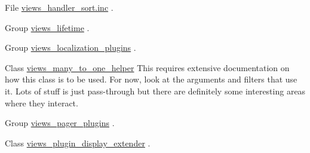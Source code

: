 \begin{DoxyDescription}
\item[File \hyperlink{views__handler__sort_8inc}{views\_\-handler\_\-sort.inc} ]. 
\end{DoxyDescription}

\label{todo__todo000087}
\hypertarget{todo__todo000087}{}
 
\begin{DoxyDescription}
\item[Group \hyperlink{group__views__lifetime}{views\_\-lifetime} ].


\end{DoxyDescription}

\label{todo__todo000085}
\hypertarget{todo__todo000085}{}
 
\begin{DoxyDescription}
\item[Group \hyperlink{group__views__localization__plugins}{views\_\-localization\_\-plugins} ].


\end{DoxyDescription}

\label{todo__todo000080}
\hypertarget{todo__todo000080}{}
 
\begin{DoxyDescription}
\item[Class \hyperlink{classviews__many__to__one__helper}{views\_\-many\_\-to\_\-one\_\-helper} ]This requires extensive documentation on how this class is to be used. For now, look at the arguments and filters that use it. Lots of stuff is just pass-\/through but there are definitely some interesting areas where they interact.


\end{DoxyDescription}

\label{todo__todo000086}
\hypertarget{todo__todo000086}{}
 
\begin{DoxyDescription}
\item[Group \hyperlink{group__views__pager__plugins}{views\_\-pager\_\-plugins} ].


\end{DoxyDescription}

\label{todo__todo000084}
\hypertarget{todo__todo000084}{}
 
\begin{DoxyDescription}
\item[Class \hyperlink{classviews__plugin__display__extender}{views\_\-plugin\_\-display\_\-extender} ].


\end{DoxyDescription}

